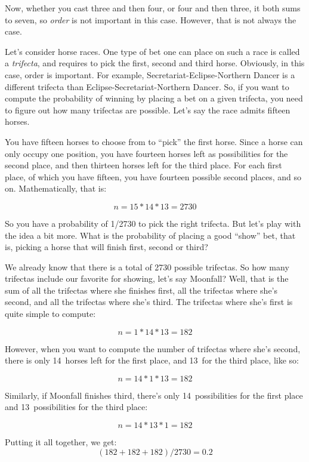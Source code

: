 \documentclass{report}
\begin{document}
	Now, whether you cast three and then four, or four and then three, it both sums to seven, so \emph{order} is not important in this case. However, that is not always the case.
	
	Let's consider horse races. One type of bet one can place on such a race is called a \emph{trifecta}, and requires to pick the first, second and third horse. Obviously, in this case, order is important. For example, Secretariat-Eclipse-Northern Dancer is a different trifecta than Eclipse-Secretariat-Northern Dancer. So, if you want to compute the probability of winning by placing a bet on a given trifecta, you need to figure out how many trifectas are possible. Let's say the race admits fifteen horses.
	
	You have fifteen horses to choose from to ``pick'' the first horse. Since a horse can only occupy one position, you have fourteen horses left as possibilities for the second place, and then thirteen horses left for the third place. For each first place, of which you have fifteen, you have fourteen possible second places, and so on. Mathematically, that is:
	
	\[
	n = 15 * 14 * 13 = 2730
	\]
	
	So you have a probability of 1/2730 to pick the right trifecta. But let's play with the idea a bit more. What is the probability of placing a good ``show'' bet, that is, picking a horse that will finish first, second or third?
	
	We already know that there is a total of 2730 possible trifectas. So how many trifectas include our favorite for showing, let's say Moonfall? Well, that is the sum of all the trifectas where she finishes first, all the trifectas where she's second, and all the trifectas where she's third. The trifectas where she's first is quite simple to compute:
	
	\[
	n = 1 * 14 * 13 = 182
	\]

	However, when you want to compute the number of trifectas where she's second, there is only 14~horses left for the first place, and 13~for the third place, like so:
	
	\[
	n = 14 * 1 * 13 = 182
	\]
	
	Similarly, if Moonfall finishes third, there's only 14~possibilities for the first place and 13~possibilities for the third place:
	
	\[
	n = 14 * 13 * 1 = 182
	\]
	
	Putting it all together, we get:
	\[
	(182+182+182)/2730 = 0.2
	\]
	
\end{document}
